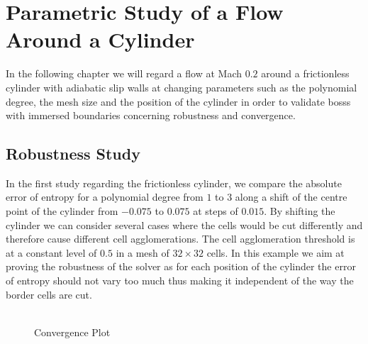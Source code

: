 \chapter{Parametric Study of a Flow Around a Cylinder}
	\label{eulerVerification}
	In the following chapter we will regard a flow at Mach $0.2$ around a frictionless cylinder with adiabatic slip walls at changing parameters such as the polynomial degree, the mesh size and the position of the cylinder in order to validate \gls{bosss} with immersed boundaries concerning robustness and convergence.

	\section{Robustness Study}
	In the first study regarding the frictionless cylinder, we compare the absolute error of entropy for a polynomial degree from $1$ to $3$ along a shift of the centre point of the cylinder from $-0.075$ to $0.075$ at steps of $0.015$. By shifting the cylinder we can consider several cases where the cells would be cut differently and therefore cause different cell agglomerations. The cell agglomeration threshold is at a constant level of $0.5$ in a mesh of $32 \times 32$ cells. In this example we aim at proving the robustness of the solver as for each position of the cylinder the error of entropy should not vary too much thus making it independent of the way the border cells are cut. \\ \\

	\begin{figure}[htp]	
		\centering
		\caption{Convergence Plot}
		\label{shifterror}
	\end{figure}
	

